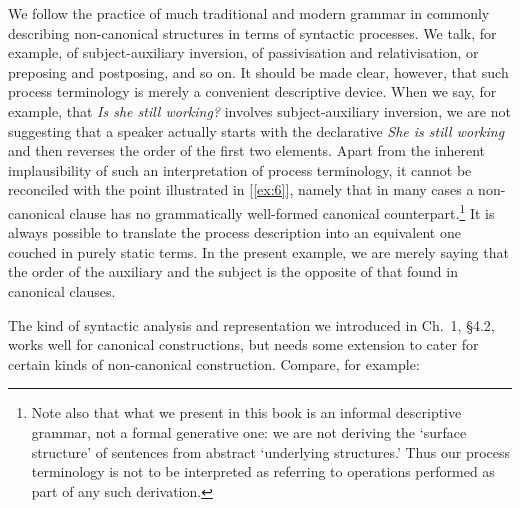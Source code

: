 We follow the practice of much traditional and modern grammar in commonly describing non-canonical structures in terms of syntactic processes. We talk, for example, of subject-auxiliary inversion, of passivisation and relativisation, or preposing and postposing, and so on. It should be made clear, however, that such process terminology is merely a convenient descriptive device. When we say, for example, that \textit{Is she still working?} involves subject-auxiliary inversion, we are not suggesting that a speaker actually starts with the declarative \textit{She is still working} and then reverses the order of the first two elements. Apart from the inherent implausibility of such an interpretation of process terminology, it cannot be reconciled with the point illustrated in [\ref{ex:6}], namely that in many cases a non-canonical clause has no grammatically well-formed canonical counterpart.\footnote{Note also that what we present in this book is an informal descriptive grammar, not a formal generative one: we are not deriving the `surface structure' of sentences from abstract `underlying structures.' Thus our process terminology is not to be interpreted as referring to operations performed as part of any such derivation.} It is always possible to translate the process description into an equivalent one couched in purely static terms. In the present example, we are merely saying that the order of the auxiliary and the subject is the opposite of that found in canonical clauses.

The kind of syntactic analysis and representation we introduced in Ch.~1, §4.2, works well for canonical constructions, but needs some extension to cater for certain kinds of non-canonical construction. Compare, for example:

